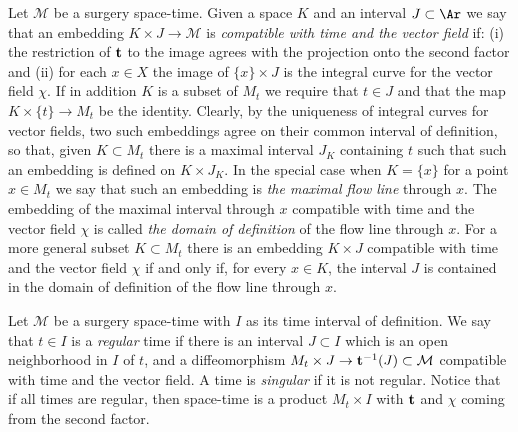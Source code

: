 \begin{definition}
\label{def:compatible-with-time-vector-field}
Let ${\mathcal M}$ be a surgery space-time. Given a space $K$ and an
interval $J\subset \Ar$  we say that an embedding $K\times J\to
{\mathcal M}$ is {\em compatible with  time  and the vector field}
if: (i) the restriction of ${\bf t}$ to the image agrees with the
projection onto the second factor and (ii) for each $x\in X$ the
image of $\{x\}\times J$ is the integral curve for the vector field
$\chi$.
 If in addition $K$ is a subset of $M_{t}$
we require that $t\in J$ and that the map $K\times\{t\}\to M_{t}$ be
the identity. Clearly, by the uniqueness of integral curves for vector fields, two such
embeddings agree on their common interval of definition, so that,
given $K\subset M_{t}$ there is a maximal interval $J_K$ containing
$t$ such that such an embedding is defined on $K\times J_K$. In the
special case when $K=\{x\}$ for a point $x\in M_{t}$ we say that
such an embedding is {\em the maximal flow line} through $x$. The
embedding of the maximal interval through $x$ compatible with time
and the vector field $\chi$ is called {\em the domain of definition}
of the flow line through $x$. For a more general subset $K\subset
M_{t}$ there is an embedding $K\times J$ compatible with time and
the vector field $\chi$ if and only if, for every $x\in K$, the
interval $J$ is contained in the domain of definition of the flow
line through $x$.
\end{definition}


\begin{definition}
\label{def:regular-singular-time-surgery}
Let ${\mathcal M}$ be a surgery space-time with $I$ as its time
interval of definition. We say that $t\in I$ is a {\em regular} time
if there is an interval $J\subset I$ which is an open neighborhood
in $I$ of $t$, and a diffeomorphism $M_{t}\times J\to {\bf
t}^{-1}(J)\subset{\mathcal M}$ compatible with time and the vector
field. A time is {\em singular} if it is not regular. Notice that if
all times are regular, then space-time is a product $M_t\times I$
with ${\bf t}$ and $\chi$ coming from the second factor.
\end{definition}



